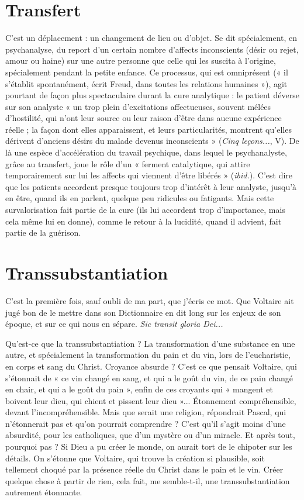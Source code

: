 \section{Transfert}
C'est un déplacement : un changement de lieu ou d’objet. Se
dit spécialement, en psychanalyse, du report d’un certain
nombre d’affects inconscients (désir ou rejet, amour ou haine) sur une autre
personne que celle qui les suscita à l’origine, spécialement pendant la petite
enfance. Ce processus, qui est omniprésent (« il s’établit spontanément, écrit
Freud, dans toutes les relations humaines »), agit pourtant de façon plus spectaculaire
durant la cure analytique : le patient déverse sur son analyste « un trop
plein d’excitations affectueuses, souvent mélées d’hostilité, qui n’ont leur
source ou leur raison d’être dans aucune expérience réelle ; la façon dont elles
apparaissent, et leurs particularités, montrent qu’elles dérivent d’anciens désirs
du malade devenus inconscients » ({\it Cinq leçons...}, V). De là une espèce d’accélération
du travail psychique, dans lequel le psychanalyste, grâce au transfert,
joue le rôle d’un « ferment catalytique, qui attire temporairement sur lui les
affects qui viennent d’être libérés » ({\it ibid.}). C’est dire que les patients accordent
presque toujours trop d'intérêt à leur analyste, jusqu’à en être, quand ils en parlent,
quelque peu ridicules ou fatigants. Mais cette survalorisation fait partie de
la cure (ils lui accordent trop d'importance, mais cela même lui en donne),
comme le retour à la lucidité, quand il advient, fait partie de la guérison.

\section{Transsubstantiation}
C'est la première fois, sauf oubli de ma part,
que j'écris ce mot. Que Voltaire ait jugé bon
de le mettre dans son Dictionnaire en dit long sur les enjeux de son époque, et
sur ce qui nous en sépare. {\it Sic transit gloria Dei...}

Qu'est-ce que la transsubstantiation ? La transformation d’une substance
en une autre, et spécialement la transformation du pain et du vin, lors de
l'eucharistie, en corps et sang du Christ. Croyance absurde ? C’est ce que pensait
Voltaire, qui s’étonnait de « ce vin changé en sang, et qui a le goût du vin,
de ce pain changé en chair, et qui a le goût du pain », enfin de ces croyants qui
« mangent et boivent leur dieu, qui chient et pissent leur dieu »... Étonnement
compréhensible, devant l’incompréhensible. Mais que serait une religion,
répondrait Pascal, qui n’étonnerait pas et qu’on pourrait comprendre ? C’est
qu'il s’agit moins d’une absurdité, pour les catholiques, que d’un mystère ou
d’un miracle. Et après tout, pourquoi pas ? Si Dieu a pu créer le monde, on
aurait tort de le chipoter sur les détails. On s’étonne que Voltaire, qui trouve la
création si plausible, soit tellement choqué par la présence réelle du Christ dans
le pain et le vin. Créer quelque chose à partir de rien, cela fait, me semble-t-il,
une transsubstantiation autrement étonnante.

